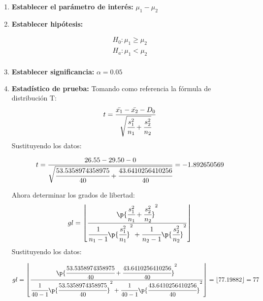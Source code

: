 \documentclass[a4paper]{report}
\begin{document}
\begin{enumerate}
    \item \textbf{Establecer el parámetro de interés:} $\mu_1-\mu_2$ 
    \item \textbf{Establecer hipótesis:}
        \begin{center}
           \begin{align*}
               H_0: \mu_1 \geq \mu_2 \\ 
               H_a: \mu_1 < \mu_2 \\
           \end{align*}
        \end{center}
    
    \item \textbf{Establecer significancia:} $\alpha = 0.05$
    \item \textbf{Estadístico de prueba:}
        Tomando como referencia la fórmula de distribución T: 
        \[
          t = \frac{
              \bar{x_1}-\bar{x_2}-D_0
            }{
                \sqrt{
                    \cfrac{s_1^2}{n_1} + \cfrac{s_2^2}{n_2}
                }
            }
        \] Sustituyendo los datos: 
        \begin{center}
           \begin{align*}
                t = \frac{
                    26.55-29.50
                    -0
                }{
                    \sqrt{
                        \cfrac{53.5358974358975}{40} + \cfrac{43.6410256410256}{40}
                    }
                } = -1.892650569
           \end{align*}
        \end{center}
        Ahora determinar los grados de libertad: 
        \[
            gl = \left\lfloor  \frac{
                \p{\cfrac{s_1^2}{n_1}+\cfrac{s_2^2}{n_2}}^2 
            }{
                \cfrac{1}{n_1-1} \p{\cfrac{s_1^2}{n_1}}^2 + \cfrac{1}{n_2-1}\p{\cfrac{s_2^2}{n_2}}^2   
            } \right\rfloor  
        \]
        Sustituyendo los datos: 
        \begin{center}
        \begin{align*}
                gl = \left\lfloor 
                    \frac{
                        \p{\cfrac{53.5358974358975}{40}+\cfrac{43.6410256410256}{40}}^2 
                    }{
                        \cfrac{1}{40-1} \p{\cfrac{53.5358974358975}{40}}^2 + \cfrac{1}{40-1}\p{\cfrac{43.6410256410256}{40}}^2   
                    } 
                \right\rfloor  = \left\lfloor 77.19882 \right\rfloor  = 77
        \end{align*}
        \end{center}
        

\end{enumerate}
\end{document}
